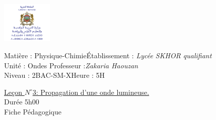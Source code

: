 \documentclass[12pt]{article}
\newcommand\headerMe[2]{\noindent{}#1\hfill#2}
\begin{document}
\begin{center}
\includegraphics[width = 0.18\textwidth]{./img/logoMin.png}
\vspace{-3cm}
\end{center}
\headerMe{Matière : Physique-Chimie}{Établissement : \emph{Lycée SKHOR qualifiant}}\\
\headerMe{ Unité : Ondes }{  Professeur :\emph{Zakaria Haouzan}}\\
\headerMe{Niveau : 2BAC-SM-X}{Heure : 5H}\\

\begin{center}
	\underline{Leçon $N^{\circ}$3: Propagation d'une onde lumineuse.}\\
Durée 5h00
\\
    \vspace{.2cm}
\hrulefill
\Large{Fiche Pédagogique}
\hrulefill\\
\end{center}
\end{document}

